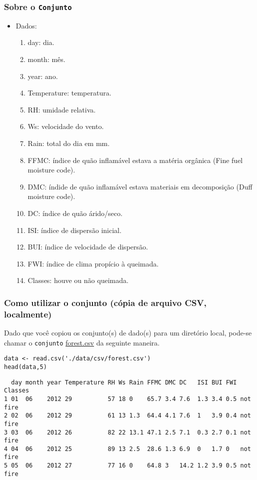 \documentclass[11pt]{article}
\begin{document}
\subsubsection{Sobre o \texttt{Conjunto}}
\label{sec:orgfe32410}
\begin{itemize}
\item Dados:
\begin{enumerate}
\item day: dia.
\item month: mês.
\item year: ano.
\item Temperature: temperatura.
\item RH: umidade relativa.
\item Ws: velocidade do vento.
\item Rain: total do dia em mm.
\item FFMC: índice de quão inflamável estava a matéria orgânica (Fine fuel moisture code).
\item DMC: índide de quão inflamável estava materiais em decomposição (Duff moisture code).
\item DC: índice de quão árido/seco.
\item ISI: índice de dispersão inicial.
\item BUI: índice de velocidade de dispersão.
\item FWI: índice de clima propício à queimada.
\item Classes: houve ou não queimada.
\end{enumerate}
\end{itemize}

\subsubsection{Como utilizar o conjunto (cópia de arquivo CSV, localmente)}
\label{sec:org96a657a}

Dado que você copiou os conjunto(s) de dado(s) para um diretório
local, pode-se chamar o \texttt{conjunto} \href{https://drive.google.com/file/d/1zuMrZgUo9vRH80HA7zJiBRJpBkGBw3hb/view?usp=sharing}{forest.csv} da seguinte maneira.

\begin{verbatim}
data <- read.csv('./data/csv/forest.csv')
head(data,5)
\end{verbatim}

\begin{verbatim}
  day month year Temperature RH Ws Rain FFMC DMC DC   ISI BUI FWI Classes    
1 01  06    2012 29          57 18 0    65.7 3.4 7.6  1.3 3.4 0.5 not fire   
2 02  06    2012 29          61 13 1.3  64.4 4.1 7.6  1   3.9 0.4 not fire   
3 03  06    2012 26          82 22 13.1 47.1 2.5 7.1  0.3 2.7 0.1 not fire   
4 04  06    2012 25          89 13 2.5  28.6 1.3 6.9  0   1.7 0   not fire   
5 05  06    2012 27          77 16 0    64.8 3   14.2 1.2 3.9 0.5 not fire   
\end{verbatim}
\clearpage
\end{document}
